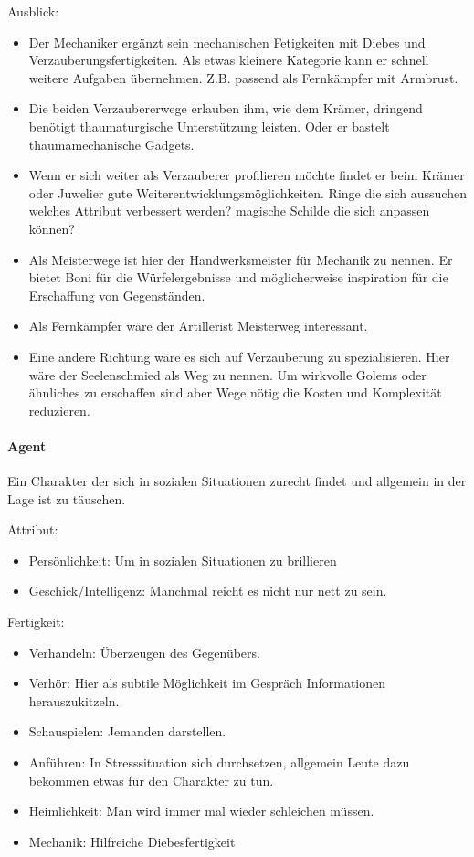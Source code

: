 \documentclass{article}
\begin{document}
Ausblick:
\begin{itemize}
\item Der Mechaniker ergänzt sein mechanischen Fetigkeiten mit Diebes und Verzauberungsfertigkeiten. Als etwas kleinere Kategorie kann er schnell weitere Aufgaben übernehmen. Z.B. passend als Fernkämpfer mit Armbrust.
\item Die beiden Verzaubererwege erlauben ihm, wie dem Krämer, dringend benötigt thaumaturgische Unterstützung leisten. Oder er bastelt thaumamechanische Gadgets.
\item Wenn er sich weiter als Verzauberer profilieren möchte findet er beim Krämer oder Juwelier gute Weiterentwicklungsmöglichkeiten. Ringe die sich aussuchen welches Attribut verbessert werden? magische Schilde die sich anpassen können?
\item Als Meisterwege ist hier der Handwerksmeister für Mechanik zu nennen. Er bietet Boni für die Würfelergebnisse und möglicherweise inspiration für die Erschaffung von Gegenständen.
\item Als Fernkämpfer wäre der Artillerist Meisterweg interessant.
\item Eine andere Richtung wäre es sich auf Verzauberung zu spezialisieren. Hier wäre der Seelenschmied als Weg zu nennen. Um wirkvolle Golems oder ähnliches zu erschaffen sind aber Wege nötig die Kosten und Komplexität reduzieren.
\end{itemize}

\paragraph{Agent}
Ein Charakter der sich in sozialen Situationen zurecht findet und allgemein in der Lage ist zu täuschen.

Attribut:
\begin{itemize}
\item Persönlichkeit: Um in sozialen Situationen zu brillieren
\item Geschick/Intelligenz: Manchmal reicht es nicht nur nett zu sein.
\end{itemize}

Fertigkeit:
\begin{itemize}
\item Verhandeln: Überzeugen des Gegenübers.
\item Verhör: Hier als subtile Möglichkeit im Gespräch Informationen herauszukitzeln.
\item Schauspielen: Jemanden darstellen.
\item Anführen: In Stresssituation sich durchsetzen, allgemein Leute dazu bekommen etwas für den Charakter zu tun.
\item Heimlichkeit: Man wird immer mal wieder schleichen müssen.
\item Mechanik: Hilfreiche Diebesfertigkeit
\end{itemize}
\end{document}

